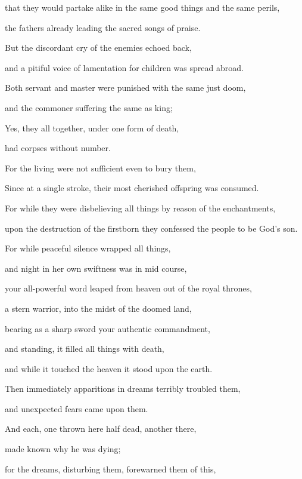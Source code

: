 {\par }{\QB that they would partake alike in the same good things and the same perils,
\par }{\QB the fathers already leading the sacred songs of praise.
\par }{\Q {}But the discordant cry of the enemies echoed back,
\par }{\QB and a pitiful voice of lamentation for children was spread abroad.
\par }{\Q {}Both servant and master were punished with the same just doom,
\par }{\QB and the commoner suffering the same as king;
\par }{\Q {}Yes, they all together, under one form of death,
\par }{\QB had corpses without number.
\par }{\Q For the living were not sufficient even to bury them,
\par }{\QB Since at a single stroke, their most cherished offspring was consumed.
\par }{\Q {}For while they were disbelieving all things by reason of the enchantments,
\par }{\QB upon the destruction of the firstborn they confessed the people to be God’s son.
\par }{\Q {}For while peaceful silence wrapped all things,
\par }{\QB and night in her own swiftness was in mid course,
\par }{\Q {}your all-powerful word leaped from heaven out of the royal thrones,
\par }{\QB a stern warrior, into the midst of the doomed land,
\par }{\Q {}bearing as a sharp sword your authentic commandment,
\par }{\QB and standing, it filled all things with death,
\par }{\QB and while it touched the heaven it stood upon the earth.
\par }{\Q {}Then immediately apparitions in dreams terribly troubled them,
\par }{\QB and unexpected fears came upon them.
\par }{\Q {}And each, one thrown here half dead, another there,
\par }{\QB made known why he was dying;
\par }{\Q {}for the dreams, disturbing them, forewarned them of this,
}
